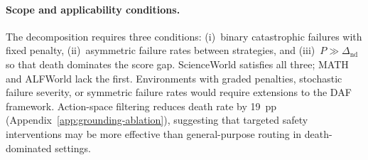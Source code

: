\paragraph{Scope and applicability conditions.}
The decomposition requires three conditions: (i)~binary catastrophic failures with fixed penalty, (ii)~asymmetric failure rates between strategies, and (iii)~$P \gg \Delta_\text{nd}$ so that death dominates the score gap. ScienceWorld satisfies all three; MATH and ALFWorld lack the first. Environments with graded penalties, stochastic failure severity, or symmetric failure rates would require extensions to the DAF framework. Action-space filtering reduces death rate by 19~pp (Appendix~\ref{app:grounding-ablation}), suggesting that targeted safety interventions may be more effective than general-purpose routing in death-dominated settings.

